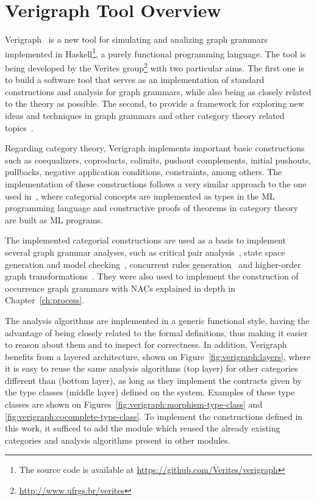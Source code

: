 \chapter{Verigraph Tool Overview}\label{ch:verigraph}

Verigraph~\cite{verigraph} is a new tool for simulating and analizing graph grammars implemented in Haskell\footnote{The source code is available at \url{https://github.com/Verites/verigraph}}, a purely functional programming language. The tool is being developed by the Verites group\footnote{\url{http://www.ufrgs.br/verites}} with two particular aims. The first one is to build a software tool that serves as an implementation of standard constructions and analysis for graph grammars, while also being as closely related to the theory as possible. The second, to provide a framework for exploring new ideas and techniques in graph grammars and other category theory related topics~\cite{BezerraETMF2016,Costa2016,CostaETMF2016, Becker2014}.

Regarding category theory, Verigraph implements important basic constructions such as coequalizers, coproducts, colimits, pushout complements, initial pushouts, pullbacks, negative application conditions, constraints, among others. The implementation of these constructions follows a very similar approach to the one used in~\cite{Rydeheard1988}, where categorial concepts are implemented as types in the ML programming language and constructive proofs of theorems in category theory are built as ML programs.

The implemented categorial constructions are used as a basis to implement several graph grammar analyses, such as critical pair analysis~\cite{Lambers2006}, state space generation and model checking~\cite{Becker2014}, concurrent rules generation~\cite{BezerraETMF2016} and higher-order graph transformations~\cite{Machado2015}. They were also used to implement the construction of occurrence graph grammars with NACs explained in depth in Chapter~\ref{ch:process}.

The analysis algorithms are implemented in a generic functional style, having the advantage of being closely related to the formal definitions, thus making it easier to reason about them and to inspect for correctness. 
In addition, Verigraph benefits from a layered architecture, shown on Figure~\ref{fig:verigraph:layers}, where it is easy to reuse the same analysis algorithms (top layer) for other categories different than  (bottom layer), as long as they implement the contracts given
by the type classes (middle layer) defined on the system.
Examples of these type classes are shown on Figures~\ref{fig:verigraph:morphism-type-class} and \ref{fig:verigraph:cocomplete-type-class}. To implement the constructions defined in this work, it sufficed to add the module  which  reused the already existing categories and analysis algorithms present in other modules.

